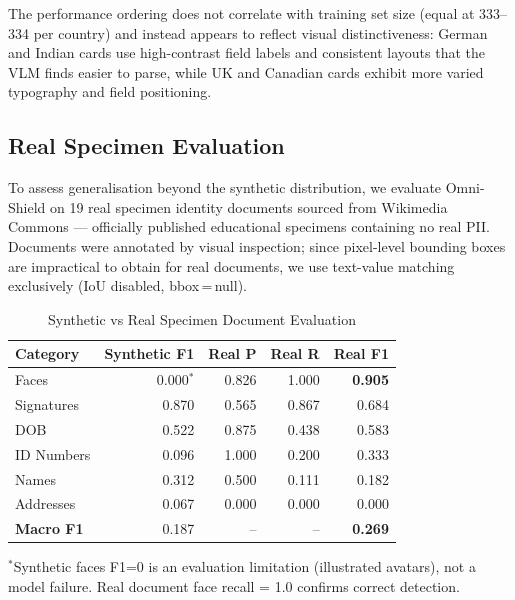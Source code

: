 \documentclass[conference]{IEEEtran}
\begin{document}
The performance ordering does not correlate with
training set size (equal at 333--334 per country)
and instead appears to reflect visual distinctiveness:
German and Indian cards use high-contrast field
labels and consistent layouts that the VLM finds
easier to parse, while UK and Canadian cards exhibit
more varied typography and field positioning.

\subsection{Real Specimen Evaluation}
\label{sec:real_eval}

To assess generalisation beyond the synthetic
distribution, we evaluate Omni-Shield on 19 real
specimen identity documents sourced from Wikimedia
Commons --- officially published educational
specimens containing no real PII.
Documents were annotated by visual inspection;
since pixel-level bounding boxes are impractical
to obtain for real documents, we use text-value
matching exclusively (IoU disabled, bbox\,=\,null).

\begin{table}[h]\centering
\caption{Synthetic vs Real Specimen Document Evaluation}
\label{tab:real_eval}
\begin{tabular}{lrrrr}
\toprule
Category & Synthetic F1 & Real P & Real R & Real F1 \\
\midrule
Faces      & 0.000$^*$ & 0.826 & 1.000 & \textbf{0.905} \\
Signatures & 0.870      & 0.565 & 0.867 & 0.684 \\
DOB        & 0.522      & 0.875 & 0.438 & 0.583 \\
ID Numbers & 0.096      & 1.000 & 0.200 & 0.333 \\
Names      & 0.312      & 0.500 & 0.111 & 0.182 \\
Addresses  & 0.067      & 0.000 & 0.000 & 0.000 \\
\midrule
\textbf{Macro F1} & 0.187 & -- & -- & \textbf{0.269} \\
\bottomrule
\end{tabular}
\vspace{2pt}
\footnotesize{$^*$Synthetic faces F1=0 is an evaluation
limitation (illustrated avatars), not a model failure.
Real document face recall = 1.0 confirms correct detection.}
\end{table}
\end{document}
